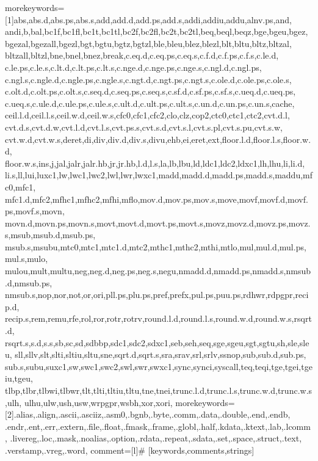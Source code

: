 \documentclass[print]{dissertation}%
\theoremstyle{definition}
\theoremstyle{definition}
\theoremstyle{definition}
\theoremstyle{definition}
\begin{document}
\renewcommand{\baselinestretch}{1.2}\normalsize

%
{morekeywords=[1]{abs,abs.d,abs.ps,abs.s,add,add.d,add.ps,add.s,addi,addiu,addu,alnv.ps,and,%
  andi,b,bal,bc1f,bc1fl,bc1t,bc1tl,bc2f,bc2fl,bc2t,bc2tl,beq,beql,beqz,bge,bgeu,bgez,%
  bgezal,bgezall,bgezl,bgt,bgtu,bgtz,bgtzl,ble,bleu,blez,blezl,blt,bltu,bltz,bltzal,%
  bltzall,bltzl,bne,bnel,bnez,break,c.eq.d,c.eq.ps,c.eq.s,c.f.d,c.f.ps,c.f.s,c.le.d,%
  c.le.ps,c.le.s,c.lt.d,c.lt.ps,c.lt.s,c.nge.d,c.nge.ps,c.nge.s,c.ngl.d,c.ngl.ps,%
  c.ngl.s,c.ngle.d,c.ngle.ps,c.ngle.s,c.ngt.d,c.ngt.ps,c.ngt.s,c.ole.d,c.ole.ps,c.ole.s,%
  c.olt.d,c.olt.ps,c.olt.s,c.seq.d,c.seq.ps,c.seq.s,c.sf.d,c.sf.ps,c.sf.s,c.ueq.d,c.ueq.ps,%
  c.ueq.s,c.ule.d,c.ule.ps,c.ule.s,c.ult.d,c.ult.ps,c.ult.s,c.un.d,c.un.ps,c.un.s,cache,%
  ceil.l.d,ceil.l.s,ceil.w.d,ceil.w.s,cfc0,cfc1,cfc2,clo,clz,cop2,ctc0,ctc1,ctc2,cvt.d.l,%
  cvt.d.s,cvt.d.w,cvt.l.d,cvt.l.s,cvt.ps.s,cvt.s.d,cvt.s.l,cvt.s.pl,cvt.s.pu,cvt.s.w,%
  cvt.w.d,cvt.w.s,deret,di,div,div.d,div.s,divu,ehb,ei,eret,ext,floor.l.d,floor.l.s,floor.w.d,%
  floor.w.s,ins,j,jal,jalr,jalr.hb,jr,jr.hb,l.d,l.s,la,lb,lbu,ld,ldc1,ldc2,ldxc1,lh,lhu,li,li.d,%
  li.s,ll,lui,luxc1,lw,lwc1,lwc2,lwl,lwr,lwxc1,madd,madd.d,madd.ps,madd.s,maddu,mfc0,mfc1,%
  mfc1.d,mfc2,mfhc1,mfhc2,mfhi,mflo,mov.d,mov.ps,mov.s,move,movf,movf.d,movf.ps,movf.s,movn,%
  movn.d,movn.ps,movn.s,movt,movt.d,movt.ps,movt.s,movz,movz.d,movz.ps,movz.s,msub,msub.d,msub.ps,%
  msub.s,msubu,mtc0,mtc1,mtc1.d,mtc2,mthc1,mthc2,mthi,mtlo,mul,mul.d,mul.ps,mul.s,mulo,%
  mulou,mult,multu,neg,neg.d,neg.ps,neg.s,negu,nmadd.d,nmadd.ps,nmadd.s,nmsub.d,nmsub.ps,%
  nmsub.s,nop,nor,not,or,ori,pll.ps,plu.ps,pref,prefx,pul.ps,puu.ps,rdhwr,rdpgpr,recip.d,%
  recip.s,rem,remu,rfe,rol,ror,rotr,rotrv,round.l.d,round.l.s,round.w.d,round.w.s,rsqrt.d,%
  rsqrt.s,s.d,s.s,sb,sc,sd,sdbbp,sdc1,sdc2,sdxc1,seb,seh,seq,sge,sgeu,sgt,sgtu,sh,sle,sleu,%
  sll,sllv,slt,slti,sltiu,sltu,sne,sqrt.d,sqrt.s,sra,srav,srl,srlv,ssnop,sub,sub.d,sub.ps,%
  sub.s,subu,suxc1,sw,swc1,swc2,swl,swr,swxc1,sync,synci,syscall,teq,teqi,tge,tgei,tgeiu,tgeu,%
  tlbp,tlbr,tlbwi,tlbwr,tlt,tlti,tltiu,tltu,tne,tnei,trunc.l.d,trunc.l.s,trunc.w.d,trunc.w.s,ulh,%
  ulhu,ulw,ush,usw,wrpgpr,wsbh,xor,xori},%
morekeywords=[2]{.alias,.align,.ascii,.asciiz,.asm0,.bgnb,.byte,.comm,.data,.double,.end,.endb,%
  .endr,.ent,.err,.extern,.file,.float,.fmask,.frame,.globl,.half,.kdata,.ktext,.lab,.lcomm,%
  .livereg,.loc,.mask,.noalias,.option,.rdata,.repeat,.sdata,.set,.space,.struct,.text,%
  .verstamp,.vreg,.word},%
comment=[l]\#%
}[keywords,comments,strings]
\end{document}
